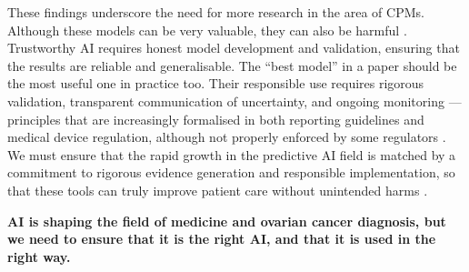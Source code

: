 These findings underscore the need for more research in the area of \glspl{CPM}. Although these models can be very valuable, they can also be harmful \cite{vancalsterCalibrationRiskPrediction2015}. Trustworthy AI requires honest model development and validation, ensuring that the results are reliable and generalisable. The \enquote{best model} in a paper should be the most useful one in practice too. Their responsible use requires rigorous validation, transparent communication of uncertainty, and ongoing monitoring --- principles that are increasingly formalised in both reporting guidelines and medical device regulation, although not properly enforced by some regulators \cite{mehtaEvaluatingTransparencyAI2025}. We must ensure that the rapid growth in the predictive AI field is matched by a commitment to rigorous evidence generation and responsible implementation, so that these tools can truly improve patient care without unintended harms \cite{ShowUsEvidence2026, goldenbergAIActuallyImproving2026}. 

\textbf{AI is shaping the field of medicine and ovarian cancer diagnosis, but we need to ensure that it is the right AI, and that it is used in the right way.}
